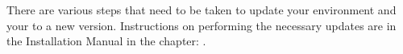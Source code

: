 There are various steps that need to be taken to update your environment and your \gdprojects{} to a new version. Instructions on performing the necessary updates are in the Installation Manual in the chapter: . 












